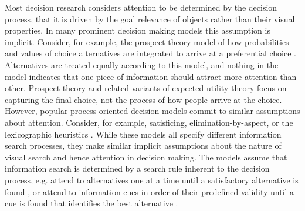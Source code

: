 Most decision research considers attention to be determined by the decision process, that it is driven by the goal relevance of objects rather than their visual properties. In many prominent decision making models this assumption is implicit. Consider, for example, the prospect theory model of how probabilities and values of choice alternatives are integrated to arrive at a preferential choice \citep{tversky1979}. Alternatives are treated equally according to this model, and nothing in the model indicates that one piece of information should attract more attention than other. Prospect theory and related variants of expected utility theory focus on capturing the final choice, not the process of how people arrive at the choice. However, popular process-oriented decision models commit to similar assumptions about attention. Consider, for example, satisficing, elimination-by-aspect, or the lexicographic heuristics \citep{payne1988, simon1956a}. While these models all specify different information search processes, they make similar implicit assumptions about the nature of visual search and hence attention in decision making. The  models assume that information search is determined by a search rule inherent to the decision process, e.g. attend to alternatives one at a time until a satisfactory alternative is found \citep{stuttgen2012}, or attend to information cues in order of their predefined validity until a cue is found that identifies the best alternative \citep{krefeld-schwalb2019a}.\\ 

